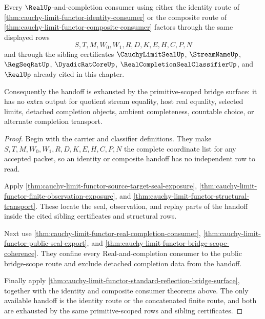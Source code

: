 \begin{theorem}
\label{thm:cauchy-limit-functor-real-completion-handoff-exhaustion}
Every $\RealUp$-and-completion consumer using either the identity route of \autoref{thm:cauchy-limit-functor-identity-consumer} or the composite route of \autoref{thm:cauchy-limit-functor-composite-consumer} factors through the same displayed rows
$$
S,T,M,W_0,W_1,R,D,K,E,H,C,P,N
$$
and through the sibling certificates $\CauchyLimitSealUp$, $\StreamNameUp$, $\RegSeqRatUp$, $\DyadicRatCoreUp$, $\RealCompletionSealClassifierUp$, and $\RealUp$ already cited in this chapter.

Consequently the handoff is exhausted by the primitive-scoped bridge surface: it has no extra output for quotient stream equality, host real equality, selected limits, detached completion objects, ambient completeness, countable choice, or alternate completion transport.
\end{theorem}
\begin{proof}
Begin with the carrier and classifier definitions. They make $S,T,M,W_0,W_1,R,D,K,E,H,C,P,N$ the complete coordinate list for any accepted packet, so an identity or composite handoff has no independent row to read.

Apply \autoref{thm:cauchy-limit-functor-source-target-seal-exposure}, \autoref{thm:cauchy-limit-functor-finite-observation-exposure}, and \autoref{thm:cauchy-limit-functor-structural-transport}. These locate the seal, observation, and replay parts of the handoff inside the cited sibling certificates and structural rows.

Next use \autoref{thm:cauchy-limit-functor-real-completion-consumer}, \autoref{thm:cauchy-limit-functor-public-seal-export}, and \autoref{thm:cauchy-limit-functor-bridge-scope-coherence}. They confine every Real-and-completion consumer to the public bridge-scope route and exclude detached completion data from the handoff.

Finally apply \autoref{thm:cauchy-limit-functor-standard-reflection-bridge-surface}, together with the identity and composite consumer theorems above. The only available handoff is the identity route or the concatenated finite route, and both are exhausted by the same primitive-scoped rows and sibling certificates.
\end{proof}


